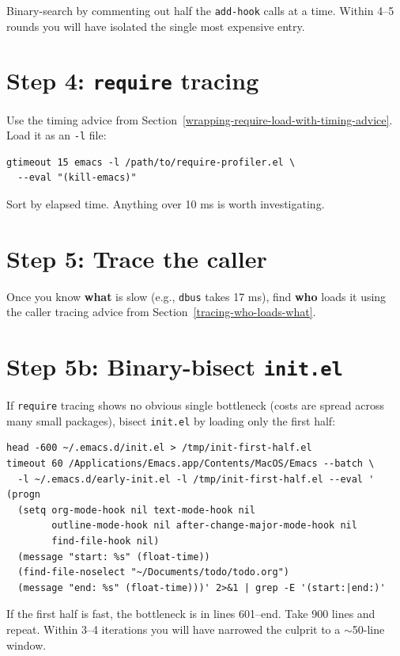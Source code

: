 Binary-search by commenting out half the \texttt{add-hook} calls at a time. Within 4--5 rounds you will have isolated the single most expensive entry.

\section{Step 4: \texttt{require} tracing}\label{step-4-require-tracing}

Use the timing advice from Section~\ref{wrapping-require-load-with-timing-advice}. Load it as an \texttt{-l} file:

\begin{verbatim}
gtimeout 15 emacs -l /path/to/require-profiler.el \
  --eval "(kill-emacs)"
\end{verbatim}

Sort by elapsed time. Anything over 10 ms is worth investigating.

\section{Step 5: Trace the caller}\label{step-5-trace-the-caller}

Once you know \textbf{what} is slow (e.g., \texttt{dbus} takes 17 ms), find \textbf{who} loads it using the caller tracing advice from Section~\ref{tracing-who-loads-what}.

\section{Step 5b: Binary-bisect \texttt{init.el}}\label{step-5b-binary-bisect-init.el}

If \texttt{require} tracing shows no obvious single bottleneck (costs are spread across many small packages), bisect \texttt{init.el} by loading only the first half:

\begin{verbatim}
head -600 ~/.emacs.d/init.el > /tmp/init-first-half.el
timeout 60 /Applications/Emacs.app/Contents/MacOS/Emacs --batch \
  -l ~/.emacs.d/early-init.el -l /tmp/init-first-half.el --eval '
(progn
  (setq org-mode-hook nil text-mode-hook nil
        outline-mode-hook nil after-change-major-mode-hook nil
        find-file-hook nil)
  (message "start: %s" (float-time))
  (find-file-noselect "~/Documents/todo/todo.org")
  (message "end: %s" (float-time)))' 2>&1 | grep -E '(start:|end:)'
\end{verbatim}

If the first half is fast, the bottleneck is in lines 601--end. Take 900 lines and repeat. Within 3--4 iterations you will have narrowed the culprit to a \(\sim\)50-line window.

